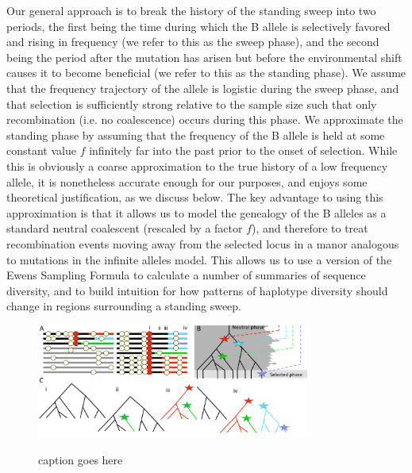 \documentclass[a4paper,10pt]{article}
\newcommand{\jb}[1]{{\it\color{blue} (#1)} }
\begin{document}
Our general approach is to break the history of the standing sweep into two periods, the first being the time during which the B allele is selectively favored and rising in frequency (we refer to this as the sweep phase), and the second being the period after the mutation has arisen but before the environmental shift causes it to become beneficial (we refer to this as the standing phase). We assume that the frequency trajectory of the allele is logistic during the sweep phase, and that selection is sufficiently strong relative to the sample size such that only recombination (i.e. no coalescence) occurs during this phase. We approximate the standing phase by assuming that the frequency of the B allele is held at some constant value $f$ infinitely far into the past prior to the onset of selection. While this is obviously a coarse approximation to the true history of a low frequency allele, it is nonetheless accurate enough for our purposes, and enjoys some theoretical justification, as we discuss below. The key advantage to using this approximation is that it allows us to model the genealogy of the B alleles as a standard neutral coalescent (rescaled by a factor $f$), and therefore to treat recombination events moving away from the selected locus in a manor analogous to mutations in the infinite alleles model. This allows us to use a version of the Ewens Sampling Formula to calculate a number of summaries of sequence diversity, and to build intuition for how patterns of haplotype diversity should change in regions surrounding a standing sweep.


\begin{figure}
	\includegraphics[width = 0.8\textwidth]{../Paper_Figures/Cartoon_of_soft_sweeps.pdf} \label{cartoon_fig_1}
	\caption{caption goes here}
\end{figure}
\end{document}
